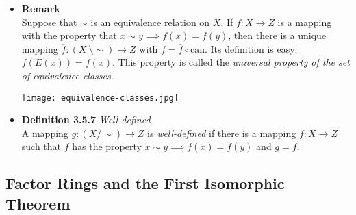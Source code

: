 \documentclass[11pt,a4paper]{article}
\begin{document}
\begin{itemize}
    \item \textbf{Remark} \\
        Suppose that $\sim$ is an equivalence relation on $X$.
        If $f : X \to Z$ is a mapping with the property that $x \sim y
        \implies f(x) = f(y)$,
        then there is a unique mapping $\overline{f} : (X \ \setminus \sim) \to Z$
        with $f = \overline{f} \circ \mathrm{can}$.
        Its definition is easy: $f(E(x)) = f(x)$.
        This property is called the \emph{universal property of the set of equivalence
        classes}.

        \begin{center}{}
            \texttt{[image: equivalence-classes.jpg]}
        \end{center}

    \item \textbf{Definition 3.5.7} \emph{Well-defined} \\
        A mapping $g : (X/\sim) \to Z$ is \emph{well-defined} if there is a mapping
        $f : X \to Z$ such that $f$ has the property
        $x \sim y \implies f(x) = f(y)$ and $g = \overline{f}$.

\end{itemize}

\subsection{Factor Rings and the First Isomorphic Theorem}
\end{document}

